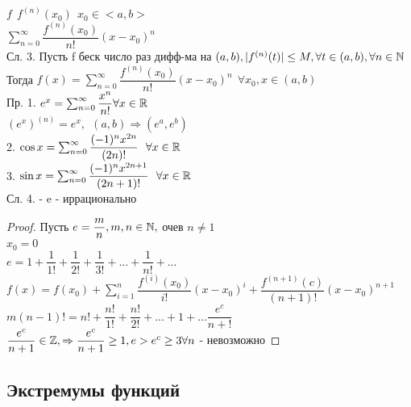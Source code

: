 $ f \ \ f^{(n)} (x_0) \ \ x_0 \in <a,b> $ \\
$ \sum_{n=0}^{\infty} \dfrac{f^{(n)} (x_0)}{n!} (x - x_0)^n $ \\
Сл. 3. Пусть f беск число раз дифф-ма на $ (a, b) , | f^{(n)} (t) | \leq M, \forall t \in (a, b), \forall n \in \mathbb{N} $ \\
Тогда $ f(x) = \sum_{n=0}^{\infty} \dfrac{f^{(n)} (x_0)}{n!} (x - x_0)^n \ \ \forall x_0, x \in (a, b) $ \\
Пр. 1. $ e^x = \sum_{n=0}^{\infty} \dfrac{x^n}{n!} \forall x \in \mathbb{R} $ \\
$ (e^x)^{(n)} = e^x, \ \ (a,b) \Rightarrow (e^a, e^b) $ \\
2. $\cos x = \sum_{n=0}^{\infty} \dfrac{(-1)^nx^{2n}}{(2n)!}  \ \ \forall x \in \mathbb{R} $ \\
3. $\sin x = \sum_{n=0}^{\infty} \dfrac{(-1)^nx^{2n+1}}{(2n+1)!}  \ \ \forall x \in \mathbb{R} $ \\
Сл. 4. - e - иррационально \\
\begin{proof}
	Пусть $ e = \dfrac{m}{n}, m,n \in \mathbb{N}, $ очев $n \neq 1 $\\
	$ x_0 = 0 $ \\
	$ e = 1 + \dfrac{1}{1!} + \dfrac{1}{2!} + \dfrac{1}{3!} + ... + \dfrac{1}{n!} + ... $  \\
	$ f(x) = f(x_0) + \sum_{i=1}^{n} \dfrac{f^{(i)} (x_0)}{i!}(x-x_0)^i + \dfrac{f^{(n+1)} (c)}{(n+1)!} (x - x_0)^{n+1}$ \\
	$ m(n-1)! = n! + \dfrac{n!}{1!} + \dfrac{n!}{2!} + ... + 1 + ... \dfrac{e^c}{n+!} $\\
	$ \dfrac{e^c}{n+1} \in \mathbb{Z}, \Rightarrow \dfrac{e^c}{n+1} \geq 1, e > e^c \geq 3 \forall n $ - невозможно
\end{proof}
\subsection{Экстремумы функций}

